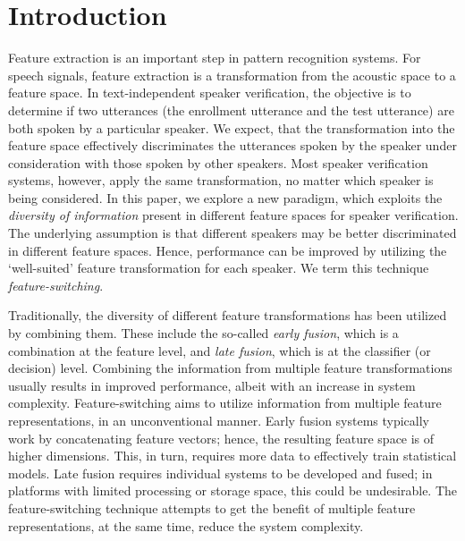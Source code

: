 \documentclass[preprint,12pt,5p]{elsarticle}
\begin{document}
\section{Introduction}
\label{sec:intro}
Feature extraction is an important step in pattern recognition systems. For
speech signals, feature extraction is a transformation from the acoustic space
to a feature space. In text-independent speaker verification, the objective is
to determine if two utterances (the enrollment utterance and the test utterance) are
both spoken by a particular speaker. We expect, that the transformation into the
feature space effectively discriminates the utterances spoken by the speaker
under consideration with those spoken by other speakers. Most speaker
verification systems, however, apply the same transformation, no matter which
speaker is being considered. In this paper, we explore a new paradigm, which
exploits the \emph{diversity of information} present in different feature spaces
for speaker verification. The underlying assumption is that different speakers
may be better discriminated in different feature spaces. Hence, performance can
be improved by utilizing the `well-suited' feature transformation for
each speaker. We term this technique \emph{feature-switching}. 

Traditionally, the diversity of different feature transformations has been
utilized by combining them. These include the so-called \emph{early fusion},
which is a combination at the feature level, and \emph{late fusion}, which is at
the classifier (or decision) level. Combining the information from multiple
feature transformations usually results in improved performance, albeit
with an increase in system complexity. Feature-switching aims to utilize
information from multiple feature representations, in an unconventional manner. 
Early fusion systems typically work by concatenating feature vectors;
hence, the resulting feature space is of higher dimensions. This, in turn, requires
more data to effectively train statistical models. Late fusion requires
individual systems to be developed and fused; in platforms with limited
processing or storage space, this could be undesirable. The feature-switching
technique attempts to get the benefit of multiple feature representations, at the
same time, reduce the system complexity.
\end{document}
